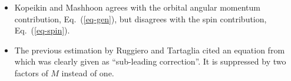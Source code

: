 \documentclass[aps,showpacs,onecolumn,floats,prd,superscriptaddress,nofootinbib]{revtex4}
\begin{document}
\begin{itemize}
\item Kopeikin and Mashhoon \cite{KopMas01} agrees with the orbital angular momentum contribution, Eq.~(\ref{eq-gen}), but disagrees with the spin contribution, Eq.~(\ref{eq-spin}).
\item The previous estimation by Ruggiero and Tartaglia \cite{RugTar06} cited an equation from \cite{Ser04} which was clearly given as ``sub-leading correction''. It is suppressed by two factors of $M$ instead of one.
\end{itemize}



\end{document}
